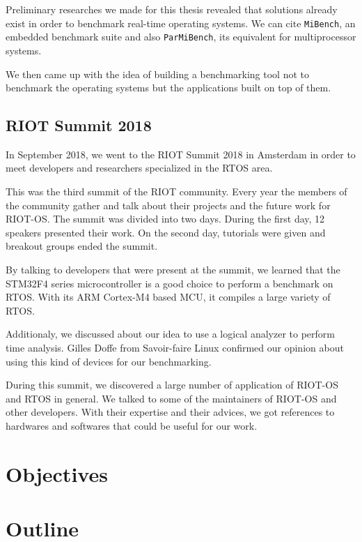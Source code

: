 Preliminary researches we made for this thesis revealed that solutions already exist in order to benchmark real-time operating systems.
We can cite \texttt{MiBench}, an embedded benchmark suite and also \texttt{ParMiBench}, its equivalent for multiprocessor systems.

We then came up with the idea of building a benchmarking tool not to benchmark the operating systems but the applications built on top of them.

\subsection*{RIOT Summit 2018}
In September 2018, we went to the RIOT Summit 2018 in Amsterdam in order to meet developers and researchers specialized in the RTOS area.

This was the third summit of the RIOT community.
Every year the members of the community gather and talk about their projects and the future work for RIOT-OS.
The summit was divided into two days. 
During the first day, 12 speakers presented their work. 
On the second day, tutorials were given and breakout groups ended the summit.

By talking to developers that were present at the summit, we learned that the STM32F4 series microcontroller is a good choice to perform a benchmark on RTOS. 
With its ARM Cortex-M4 based MCU, it compiles a large variety of RTOS.

Additionaly, we discussed about our idea to use a logical analyzer to perform time analysis. 
Gilles Doffe from Savoir-faire Linux confirmed our opinion about using this kind of devices for our benchmarking.

During this summit, we discovered a large number of application of RIOT-OS and RTOS in general.
We talked to some of the maintainers of RIOT-OS and other developers. 
With their expertise and their advices, we got references to hardwares and softwares that could be useful for our work.

%
%
\section*{Objectives}

%
%
\section*{Outline}
